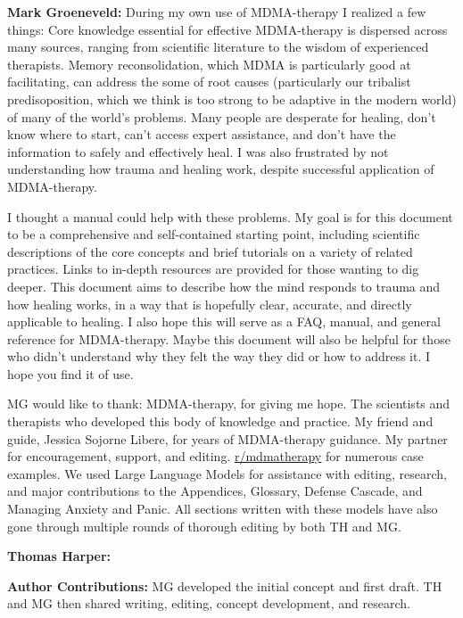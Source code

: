 \documentclass[12pt,letterpaper]{book}
\begin{document}

\textbf{Mark Groeneveld:} During my own use of MDMA-therapy I realized a few things: Core knowledge essential for effective MDMA-therapy is dispersed across many sources, ranging from scientific literature to the wisdom of experienced therapists. Memory reconsolidation, which MDMA is particularly good at facilitating, can address the some of root causes (particularly our tribalist predisoposition, which we think is too strong to be adaptive in the modern world) of many of the world's problems. Many people are desperate for healing, don't know where to start, can't access expert assistance, and don't have the information to safely and effectively heal. I was also frustrated by not understanding how trauma and healing work, despite successful application of MDMA-therapy.

I thought a manual could help with these problems. My goal is for this document to be a comprehensive and self-contained starting point, including scientific descriptions of the core concepts and brief tutorials on a variety of related practices. Links to in-depth resources are provided for those wanting to dig deeper. This document aims to describe how the mind responds to trauma and how healing works, in a way that is hopefully clear, accurate, and directly applicable to healing. I also hope this will serve as a FAQ, manual, and general reference for MDMA-therapy. Maybe this document will also be helpful for those who didn't understand why they felt the way they did or how to address it. I hope you find it of use.

MG would like to thank: MDMA-therapy, for giving me hope. The scientists and therapists who developed this body of knowledge and practice. My friend and guide, Jessica Sojorne Libere, for years of MDMA-therapy guidance. My partner for encouragement, support, and editing. \href{https://www.reddit.com/r/mdmatherapy}{r/mdmatherapy} for numerous case examples. We used Large Language Models for assistance with editing, research, and major contributions to the Appendices, Glossary, Defense Cascade, and Managing Anxiety and Panic. All sections written with these models have also gone through multiple rounds of thorough editing by both TH and MG.

\textbf{Thomas Harper:}

\vspace{\baselineskip}

\textbf{Author Contributions:} MG developed the initial concept and first draft. TH and MG then shared writing, editing, concept development, and research.
\end{document}
